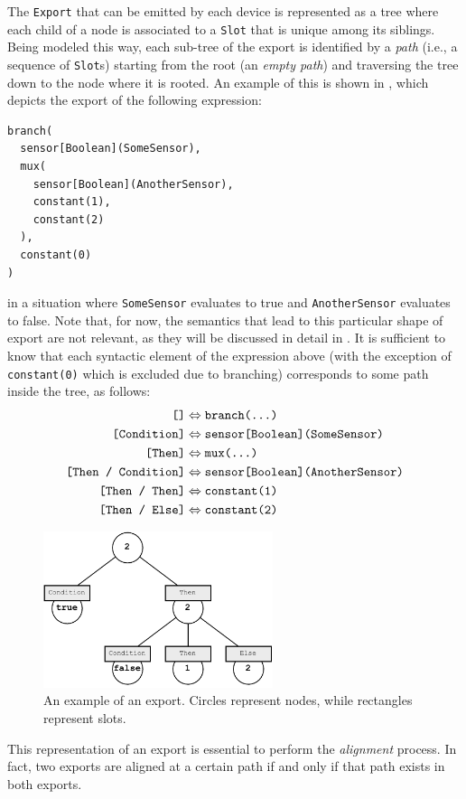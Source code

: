 The \texttt{Export} that can be emitted by each device is represented as a tree where each child of a node is associated to a \texttt{Slot} that is unique among its siblings.
%
Being modeled this way, each sub-tree of the export is identified by a \textit{path} (i.e., a sequence of \texttt{Slot}s) starting from the root (an \textit{empty path}) and traversing the tree down to the node where it is rooted.
%
An example of this is shown in , which depicts the export of the following expression:
%
\begin{lstlisting}[frame=single]
branch(
  sensor[Boolean](SomeSensor),
  mux(
    sensor[Boolean](AnotherSensor),
    constant(1),
    constant(2)
  ),
  constant(0)
)
\end{lstlisting}
%
in a situation where \texttt{SomeSensor} evaluates to true and \texttt{AnotherSensor} evaluates to false.
%
Note that, for now, the semantics that lead to this particular shape of export are not relevant, as they will be discussed in detail in .
%
It is sufficient to know that each syntactic element of the expression above (with the exception of \texttt{constant(0)} which is excluded due to branching) corresponds to some path inside the tree, as follows:
%
\begin{align*}
    \texttt{[]} &\Leftrightarrow \texttt{branch(...)} \\
    \texttt{[Condition]} &\Leftrightarrow \texttt{sensor[Boolean](SomeSensor)} \\
    \texttt{[Then]} &\Leftrightarrow \texttt{mux(...)} \\
    \texttt{[Then / Condition]} &\Leftrightarrow \texttt{sensor[Boolean](AnotherSensor)} \\
    \texttt{[Then / Then]} &\Leftrightarrow \texttt{constant(1)} \\
    \texttt{[Then / Else]} &\Leftrightarrow \texttt{constant(2)} \\
\end{align*}
%
\begin{figure}
    \centering
    \includegraphics[width=0.6\textwidth]{figures/export-example.pdf}
    \caption{An example of an export. Circles represent nodes, while rectangles represent slots.}
    \label{fig:export-example}
\end{figure}
%
This representation of an export is essential to perform the \textit{alignment} process.
%
In fact, two exports are aligned at a certain path if and only if that path exists in both exports.

